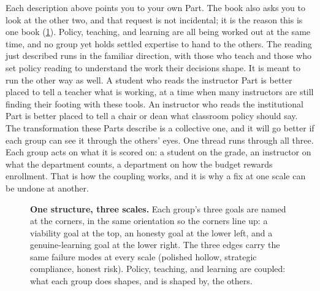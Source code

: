\documentclass{SIAMbook2023}
\begin{document}
Each description above points you to your own Part. The book also asks you to look at the other two, and that request is not incidental; it is the reason this is one book (\cref{fig:three-scales}). Policy, teaching, and learning are all being worked out at the same time, and no group yet holds settled expertise to hand to the others. The reading just described runs in the familiar direction, with those who teach and those who set policy reading to understand the work their decisions shape. It is meant to run the other way as well. A student who reads the instructor Part is better placed to tell a teacher what is working, at a time when many instructors are still finding their footing with these tools. An instructor who reads the institutional Part is better placed to tell a chair or dean what classroom policy should say. The transformation these Parts describe is a collective one, and it will go better if each group can see it through the others' eyes. One thread runs through all three. Each group acts on what it is scored on: a student on the grade, an instructor on what the department counts, a department on how the budget rewards enrollment. That is how the coupling works, and it is why a fix at one scale can be undone at another.

\begin{figure}[H]
\centering
{}
\caption{\textbf{One structure, three scales.} Each group's three goals are named at the corners, in the same orientation so the corners line up: a viability goal at the top, an honesty goal at the lower left, and a genuine-learning goal at the lower right. The three edges carry the same failure modes at every scale (polished hollow, strategic compliance, honest risk). Policy, teaching, and learning are coupled: what each group does shapes, and is shaped by, the others.}
\label{fig:three-scales}
\end{figure}
\end{document}
